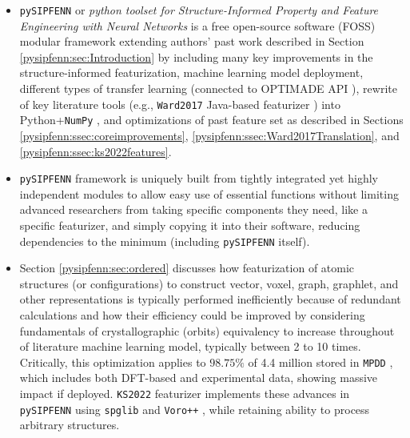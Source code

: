 \begin{itemize}
    \item \texttt{pySIPFENN} or \textit{python toolset for Structure-Informed Property and Feature Engineering with Neural Networks} is a free open-source software (FOSS) modular framework extending authors' past work \cite{Krajewski2022ExtensibleNetworks} described in Section \ref{pysipfenn:sec:Introduction} by including many key improvements in the structure-informed featurization, machine learning model deployment, different types of transfer learning (connected to OPTIMADE API \cite{Evans2024DevelopmentsExchange}), rewrite of key literature tools (e.g., \texttt{Ward2017} Java-based featurizer \cite{Ward2017}) into Python+\texttt{NumPy} \cite{Harris2020ArrayNumPy}, and optimizations of past feature set as described in Sections \ref{pysipfenn:ssec:coreimprovements}, \ref{pysipfenn:ssec:Ward2017Translation}, and \ref{pysipfenn:ssec:ks2022features}.
    
    \item \texttt{pySIPFENN} framework is uniquely built from tightly integrated yet highly independent modules to allow easy use of essential functions without limiting advanced researchers from taking specific components they need, like a specific featurizer, and simply copying it into their software, reducing dependencies to the minimum (including \texttt{pySIPFENN} itself).
    
    \item Section \ref{pysipfenn:sec:ordered} discusses how featurization of atomic structures (or configurations) to construct vector, voxel, graph, graphlet, and other representations is typically performed inefficiently because of redundant calculations and how their efficiency could be improved by considering fundamentals of crystallographic (orbits) equivalency to increase throughout of literature machine learning model, typically between 2 to 10 times. Critically, this optimization applies to $98.75\%$ of 4.4 million stored in \texttt{MPDD} \cite{Krajewski2021MPDD:Database}, which includes both DFT-based \cite{Saal2013MaterialsOQMD, Kirklin2015TheEnergies, Shen2022ReflectionsOQMD, Curtarolo2013AFLOW:Discovery, Toher2018TheDiscovery, Jain2013Commentary:Innovation, Choudhary2020TheDesign, Merchant2023ScalingDiscovery} and experimental \cite{Grazulis2009CrystallographyStructures, Grazulis2012CrystallographyCollaboration, Grazulis2019CrystallographyPerspectives} data, showing massive impact if deployed. \texttt{KS2022} featurizer implements these advances in \texttt{pySIPFENN} using \texttt{spglib} \cite{Togo2018Spglib:Search} and \texttt{Voro++} \cite{Rycroft2007MultiscaleFlow, Rycroft2009Voro++:C++, Lu2023AnCells}, while retaining ability to process arbitrary structures.
    

\end{itemize}
